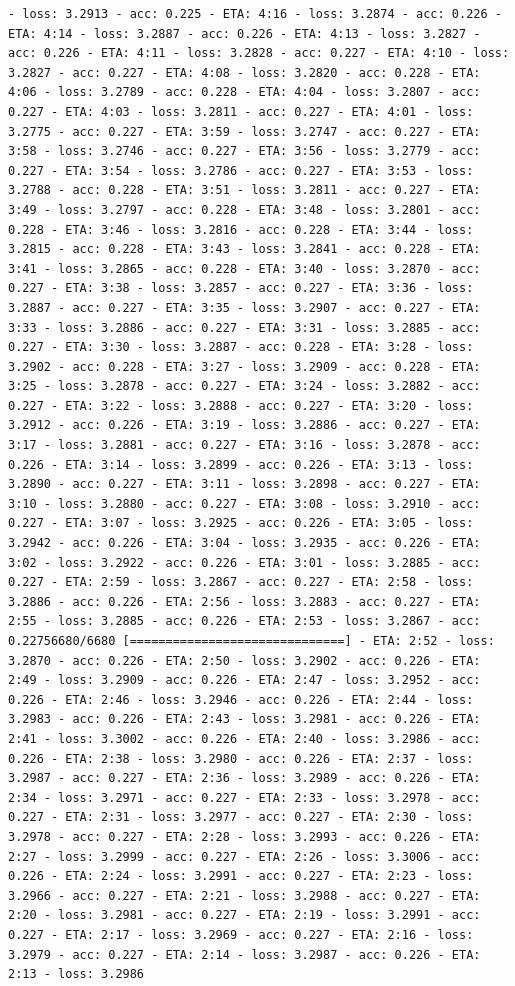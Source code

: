 \documentclass[11pt]{article}
\begin{document}
\begin{Verbatim}[commandchars=\\\{\}]
- loss: 3.2913 - acc: 0.225 - ETA: 4:16 - loss: 3.2874 - acc: 0.226 - ETA: 4:14 - loss: 3.2887 - acc: 0.226 - ETA: 4:13 - loss: 3.2827 - acc: 0.226 - ETA: 4:11 - loss: 3.2828 - acc: 0.227 - ETA: 4:10 - loss: 3.2827 - acc: 0.227 - ETA: 4:08 - loss: 3.2820 - acc: 0.228 - ETA: 4:06 - loss: 3.2789 - acc: 0.228 - ETA: 4:04 - loss: 3.2807 - acc: 0.227 - ETA: 4:03 - loss: 3.2811 - acc: 0.227 - ETA: 4:01 - loss: 3.2775 - acc: 0.227 - ETA: 3:59 - loss: 3.2747 - acc: 0.227 - ETA: 3:58 - loss: 3.2746 - acc: 0.227 - ETA: 3:56 - loss: 3.2779 - acc: 0.227 - ETA: 3:54 - loss: 3.2786 - acc: 0.227 - ETA: 3:53 - loss: 3.2788 - acc: 0.228 - ETA: 3:51 - loss: 3.2811 - acc: 0.227 - ETA: 3:49 - loss: 3.2797 - acc: 0.228 - ETA: 3:48 - loss: 3.2801 - acc: 0.228 - ETA: 3:46 - loss: 3.2816 - acc: 0.228 - ETA: 3:44 - loss: 3.2815 - acc: 0.228 - ETA: 3:43 - loss: 3.2841 - acc: 0.228 - ETA: 3:41 - loss: 3.2865 - acc: 0.228 - ETA: 3:40 - loss: 3.2870 - acc: 0.227 - ETA: 3:38 - loss: 3.2857 - acc: 0.227 - ETA: 3:36 - loss: 3.2887 - acc: 0.227 - ETA: 3:35 - loss: 3.2907 - acc: 0.227 - ETA: 3:33 - loss: 3.2886 - acc: 0.227 - ETA: 3:31 - loss: 3.2885 - acc: 0.227 - ETA: 3:30 - loss: 3.2887 - acc: 0.228 - ETA: 3:28 - loss: 3.2902 - acc: 0.228 - ETA: 3:27 - loss: 3.2909 - acc: 0.228 - ETA: 3:25 - loss: 3.2878 - acc: 0.227 - ETA: 3:24 - loss: 3.2882 - acc: 0.227 - ETA: 3:22 - loss: 3.2888 - acc: 0.227 - ETA: 3:20 - loss: 3.2912 - acc: 0.226 - ETA: 3:19 - loss: 3.2886 - acc: 0.227 - ETA: 3:17 - loss: 3.2881 - acc: 0.227 - ETA: 3:16 - loss: 3.2878 - acc: 0.226 - ETA: 3:14 - loss: 3.2899 - acc: 0.226 - ETA: 3:13 - loss: 3.2890 - acc: 0.227 - ETA: 3:11 - loss: 3.2898 - acc: 0.227 - ETA: 3:10 - loss: 3.2880 - acc: 0.227 - ETA: 3:08 - loss: 3.2910 - acc: 0.227 - ETA: 3:07 - loss: 3.2925 - acc: 0.226 - ETA: 3:05 - loss: 3.2942 - acc: 0.226 - ETA: 3:04 - loss: 3.2935 - acc: 0.226 - ETA: 3:02 - loss: 3.2922 - acc: 0.226 - ETA: 3:01 - loss: 3.2885 - acc: 0.227 - ETA: 2:59 - loss: 3.2867 - acc: 0.227 - ETA: 2:58 - loss: 3.2886 - acc: 0.226 - ETA: 2:56 - loss: 3.2883 - acc: 0.227 - ETA: 2:55 - loss: 3.2885 - acc: 0.226 - ETA: 2:53 - loss: 3.2867 - acc: 0.22756680/6680 [==============================] - ETA: 2:52 - loss: 3.2870 - acc: 0.226 - ETA: 2:50 - loss: 3.2902 - acc: 0.226 - ETA: 2:49 - loss: 3.2909 - acc: 0.226 - ETA: 2:47 - loss: 3.2952 - acc: 0.226 - ETA: 2:46 - loss: 3.2946 - acc: 0.226 - ETA: 2:44 - loss: 3.2983 - acc: 0.226 - ETA: 2:43 - loss: 3.2981 - acc: 0.226 - ETA: 2:41 - loss: 3.3002 - acc: 0.226 - ETA: 2:40 - loss: 3.2986 - acc: 0.226 - ETA: 2:38 - loss: 3.2980 - acc: 0.226 - ETA: 2:37 - loss: 3.2987 - acc: 0.227 - ETA: 2:36 - loss: 3.2989 - acc: 0.226 - ETA: 2:34 - loss: 3.2971 - acc: 0.227 - ETA: 2:33 - loss: 3.2978 - acc: 0.227 - ETA: 2:31 - loss: 3.2977 - acc: 0.227 - ETA: 2:30 - loss: 3.2978 - acc: 0.227 - ETA: 2:28 - loss: 3.2993 - acc: 0.226 - ETA: 2:27 - loss: 3.2999 - acc: 0.227 - ETA: 2:26 - loss: 3.3006 - acc: 0.226 - ETA: 2:24 - loss: 3.2991 - acc: 0.227 - ETA: 2:23 - loss: 3.2966 - acc: 0.227 - ETA: 2:21 - loss: 3.2988 - acc: 0.227 - ETA: 2:20 - loss: 3.2981 - acc: 0.227 - ETA: 2:19 - loss: 3.2991 - acc: 0.227 - ETA: 2:17 - loss: 3.2969 - acc: 0.227 - ETA: 2:16 - loss: 3.2979 - acc: 0.227 - ETA: 2:14 - loss: 3.2987 - acc: 0.226 - ETA: 2:13 - loss: 3.2986 
\end{Verbatim}
\end{document}
